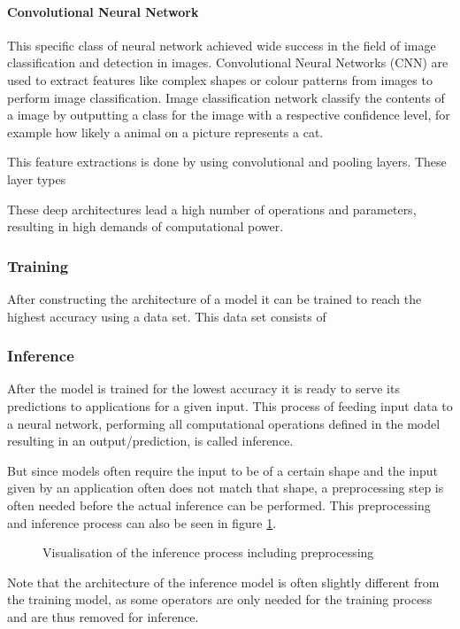 \paragraph{Convolutional Neural Network}
This specific class of neural network achieved wide success in the field of image classification and detection in images. Convolutional Neural Networks (CNN) are used to extract features like complex shapes or colour patterns from images to perform image classification. Image classification network classify the contents of a image by outputting a class for the image with a respective confidence level, for example how likely a animal on a picture represents a cat.

This feature extractions is done by using convolutional and pooling layers. These layer types



These deep architectures lead a high number of operations and parameters, resulting in high demands of computational power.
\subsubsection{Training}
After constructing the architecture of a model it can be trained to reach the highest accuracy using a data set. This data set consists of 
\subsubsection{Inference}


After the model is trained for the lowest accuracy it is ready to serve its predictions to applications for a given input. This process of feeding input data to a neural network, performing all computational operations defined in the model resulting in an output/prediction, is called inference.

But since models often require the input to be of a certain shape and the input given by an application often does not match that shape, a preprocessing step is often needed before the actual inference can be performed.
This preprocessing and inference process can also be seen in figure \ref{fig:InfProcess}.
\begin{figure}[H]
\centering

\caption{Visualisation of the inference process including preprocessing}
\label{fig:InfProcess}
\end{figure}
Note that the architecture of the inference model is often slightly different from the training model, as some operators are only needed for the training process and are thus removed for inference.







